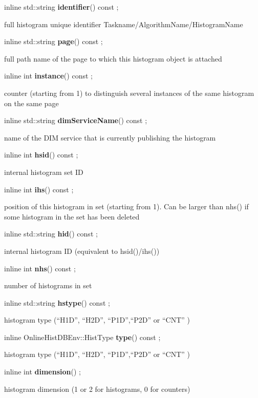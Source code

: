 \item    inline std::string {\bf identifier}() const ;

 full histogram unique identifier Taskname/AlgorithmName/HistogramName


\item    inline std::string {\bf page}() const ;

 full path name of the page to which this histogram object is attached


\item    inline int {\bf instance}() const ;

 counter (starting from 1) to distinguish several instances of the same histogram on the same page


\item    inline std::string {\bf dimServiceName}() const  ;

 name of the DIM service that is currently publishing the histogram


\item    inline int {\bf hsid}() const ;

 internal histogram set ID


\item    inline int {\bf ihs}() const ;

 position of this histogram in set (starting from 1). Can be larger than nhs() if some histogram in the set has been deleted


\item    inline std::string {\bf hid}() const ;

 internal histogram ID (equivalent to hsid()/ihs())


\item    inline int {\bf nhs}() const ;

 number of histograms in set


\item    inline std::string {\bf hstype}() const ;

 histogram type (``H1D'', ``H2D'', ``P1D'',``P2D'' or ``CNT'' )


\item    inline OnlineHistDBEnv::HistType {\bf type}() const ;

 histogram type (``H1D'', ``H2D'', ``P1D'',``P2D'' or ``CNT'' )


\item    inline int {\bf dimension}() ;

 histogram dimension (1 or 2 for histograms, 0 for counters)


